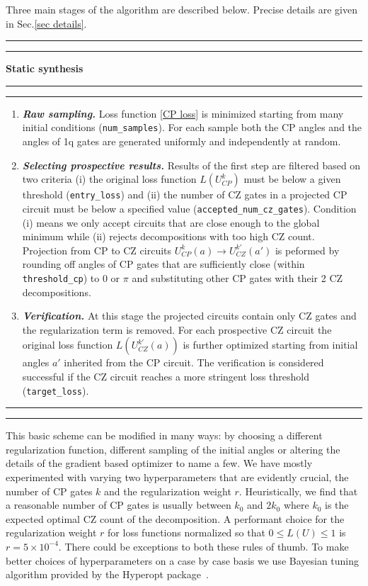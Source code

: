 \documentclass[twocolumn, amsfonts, amssymb, aps, nofootinbib]{revtex4-2}
\newcommand{\CZ}{\textsf{CZ }}
\newcommand{\CP}{\textsf{CP }}
\newcommand{\package}[1]{\textrm {#1 }}
\newcommand{\param}[1]{\texttt{#1}}
\begin{document}
Three main stages of the algorithm are described below. Precise details are given in Sec.\ref{sec details}.
\\[6pt]
\hrule
\hrule
\vspace{6pt}
{\large\textbf{\qquad Static synthesis}}
\vspace{6pt}
\hrule
\hrule
\begin{enumerate}
\item \textit{\textbf{ Raw sampling.}} Loss function \eqref{CP loss} is minimized starting from many initial conditions (\param{num\_samples}). For each sample both the \CP angles and the angles of 1q gates are generated uniformly and independently at random.
\item \textit{\textbf{Selecting prospective results.}} Results of the first step are filtered based on two criteria (i) the original loss function $L(U^k_{CP})$ must be below a given threshold (\param{entry\_loss}) and (ii) the number of \CZ gates in a projected \CP circuit must be below a specified value (\param{accepted\_num\_cz\_gates}). Condition (i) means we only accept circuits that are close enough to the global minimum while (ii) rejects decompositions with too high \CZ count. Projection from \CP to \CZ circuits $U_{CP}^k(a)\to U_{CZ}^{k'}(a')$ is peformed by rounding off angles of \CP gates that are sufficiently close (within \param{threshold\_cp}) to $0$ or $\pi$ and substituting other \CP gates with their 2 \CZ decompositions.
\item \textit{\textbf{Verification.}} At this stage the projected circuits contain only \CZ gates and the regularization term is removed. For each prospective \CZ circuit the original loss function $L(U_{CZ}^{k'}(a))$ is further optimized starting from initial angles $a'$ inherited from the \CP circuit. The verification is considered successful if the \CZ circuit reaches a more stringent loss threshold (\param{target\_loss}).
\end{enumerate}
\hrule
\hrule
\vspace{20pt}

This basic scheme can be modified in many ways: by choosing a different regularization function, different sampling of the initial angles or altering the details of the gradient based optimizer to name a few. We have mostly experimented with varying two hyperparameters that are evidently crucial, the number of \CP gates $k$ and the regularization weight $r$. Heuristically, we find that a reasonable number of \CP gates is usually between $k_0$ and $2k_0$ where $k_0$ is the expected optimal \CZ count of the decomposition. A performant choice for the regularization weight $r$ for loss functions normalized so that $0\le L(U) \le 1$ is $r=5\times 10^{-4}$. There could be exceptions to both these rules of thumb. To make better choices of hyperparameters on a case by case basis we use Bayesian tuning algorithm provided by the \package{Hyperopt} package~\cite{hyperopt}.
\end{document}
